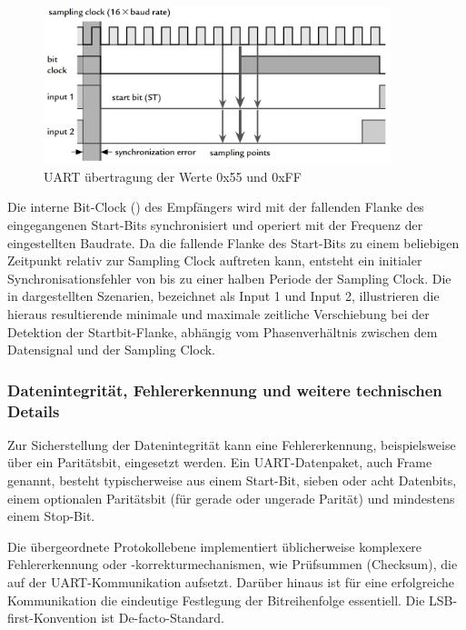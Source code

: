 \begin{figure}[h!]
	\centering
	\includegraphics[width=0.9\textwidth]{../Bilder/uart_protocoll.png}
	\caption{UART \"ubertragung der Werte 0x55 und 0xFF\\}
	\label{fig:uart_uebertragung}
\end{figure}

Die interne Bit-Clock () des Empf\"angers wird mit der fallenden Flanke des eingegangenen Start-Bits synchronisiert und operiert mit der Frequenz der eingestellten Baudrate. Da die fallende Flanke des Start-Bits zu einem beliebigen Zeitpunkt relativ zur Sampling Clock auftreten kann, entsteht ein initialer Synchronisationsfehler von bis zu einer halben Periode der Sampling Clock. Die in  dargestellten Szenarien, bezeichnet als \glqq Input 1\grqq{} und \glqq Input 2\grqq{}, illustrieren die hieraus resultierende minimale und maximale zeitliche Verschiebung bei der Detektion der Startbit-Flanke, abh\"angig vom Phasenverh\"altnis zwischen dem Datensignal und der Sampling Clock. \\

\newpage
\subsubsection{Datenintegrit\"at, Fehlererkennung und weitere technischen Details}
\label{sec:datenintegritaet}

Zur Sicherstellung der Datenintegrit\"at kann eine Fehlererkennung, beispielsweise \"uber ein Parit\"atsbit, eingesetzt werden. Ein UART-Datenpaket, auch Frame genannt, besteht typischerweise aus einem Start-Bit, sieben oder acht Datenbits, einem optionalen Parit\"atsbit (f\"ur gerade oder ungerade Parit\"at) und mindestens einem Stop-Bit.

Die \"ubergeordnete Protokollebene implementiert \"ublicherweise komplexere Fehlererkennung oder -korrekturmechanismen, wie \zB Pr\"ufsummen (Checksum), die auf der UART-Kommunikation aufsetzt. Dar\"uber hinaus ist f\"ur eine erfolgreiche Kommunikation die eindeutige Festlegung der Bitreihenfolge essentiell. Die LSB-first-Konvention ist De-facto-Standard. 

